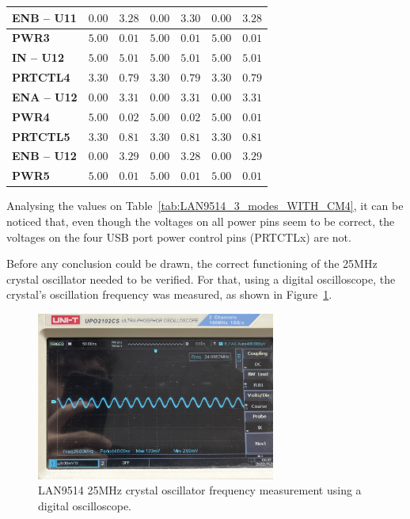 \begin{table}[h]
{\begin{tabular}{lcccccc}
		\midrule
		\textbf{ENB -- U11} & $0.00$ & $3.28$ & $0.00$ & $3.30$ & $0.00$ & $3.28$ \\
		\midrule
		\textbf{PWR3} 		& $5.00$ & $0.01$ & $5.00$ & $0.01$ & $5.00$ & $0.01$ \\
		\midrule		
		\textbf{IN -- U12} 	& $5.00$ & $5.01$ & $5.00$ & $5.01$ & $5.00$ & $5.01$ \\
		\midrule %
		\textbf{PRTCTL4} 	& $3.30$ & $0.79$ & $3.30$ & $0.79$ & $3.30$ & $0.79$ \\
		\midrule
		\textbf{ENA -- U12} & $0.00$ & $3.31$ & $0.00$ & $3.31$ & $0.00$ & $3.31$ \\
		\midrule
		\textbf{PWR4} 		& $5.00$ & $0.02$ & $5.00$ & $0.02$ & $5.00$ & $0.01$ \\
		\midrule %
		\textbf{PRTCTL5} 	& $3.30$ & $0.81$ & $3.30$ & $0.81$ & $3.30$ & $0.81$ \\
		\midrule
		\textbf{ENB -- U12} & $0.00$ & $3.29$ & $0.00$ & $3.28$ & $0.00$ & $3.29$ \\
		\midrule
		\textbf{PWR5} 		& $5.00$ & $0.01$ & $5.00$ & $0.01$ & $5.00$ & $0.01$ \\
        \bottomrule
    \end{tabular}}
\end{table}
\endgroup%

Analysing the values on Table~\ref{tab:LAN9514_3_modes_WITH_CM4}, it can be noticed that, even though the voltages on all power pins seem to be correct, the voltages on the four USB port power control pins (PRTCTLx) are not.

Before any conclusion could be drawn, the correct functioning of the 25MHz crystal oscillator needed to be verified. For that, using a digital oscilloscope, the crystal's oscillation frequency was measured, as shown in Figure~\ref{fig:25MHz_oscilloscope}.

\begin{figure}[h]
	\centering
	\includegraphics[width=0.7\textwidth]{Chapters/Figures/chapter5/prototype/25MHz_oscilloscope.png}
	\caption{LAN9514 25MHz crystal oscillator frequency measurement using a digital oscilloscope.}
	\label{fig:25MHz_oscilloscope}
\end{figure}%

